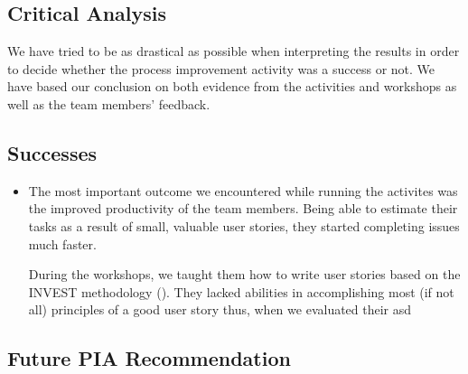 \documentclass[11pt]{article}
\begin{document}
\par

\subsection*{Critical Analysis}

\par
We have tried to be as drastical as possible when interpreting the results in order to decide whether the process improvement activity was a success or not. We have based our conclusion on both evidence from the activities and workshops as well as the team members' feedback.

\subsection*{Successes}

\begin{itemize}
\item The most important outcome we encountered while running the activites was the improved productivity of the team members. Being able to estimate their tasks as a result of small, valuable user stories, they started completing issues much faster. 

During the workshops, we taught them how to write user stories based on the INVEST methodology (\citet{invest}). They lacked abilities in accomplishing most (if not all) principles of a good user story thus, when we evaluated their asd

\end{itemize}

\subsection*{Future PIA Recommendation}

\par







\end{document}
